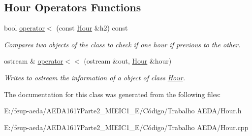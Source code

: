 \subsection*{Hour Operators Functions}
\begin{DoxyCompactItemize}
\item 
bool \hyperlink{group___hour_ga998bef44d3ea319e70f9d88ad053563b}{operator$<$} (const \hyperlink{class_hour}{Hour} \&h2) const
\begin{DoxyCompactList}\small\item\em Compares two objects of the class to check if one hour if previous to the other. \end{DoxyCompactList}\item 
ostream \& \hyperlink{group___hour_gac58157e808c8f449b403949cbd1b2737}{operator$<$$<$} (ostream \&out, \hyperlink{class_hour}{Hour} \&hour)
\begin{DoxyCompactList}\small\item\em Writes to ostream the information of a object of class \hyperlink{class_hour}{Hour}. \end{DoxyCompactList}\end{DoxyCompactItemize}


The documentation for this class was generated from the following files\+:\begin{DoxyCompactItemize}
\item 
E\+:/feup-\/aeda/\+A\+E\+D\+A1617\+Parte2\+\_\+M\+I\+E\+I\+C1\+\_\+\+E/\+Código/\+Trabalho A\+E\+D\+A/Hour.\+h\item 
E\+:/feup-\/aeda/\+A\+E\+D\+A1617\+Parte2\+\_\+M\+I\+E\+I\+C1\+\_\+\+E/\+Código/\+Trabalho A\+E\+D\+A/Hour.\+cpp\end{DoxyCompactItemize}
